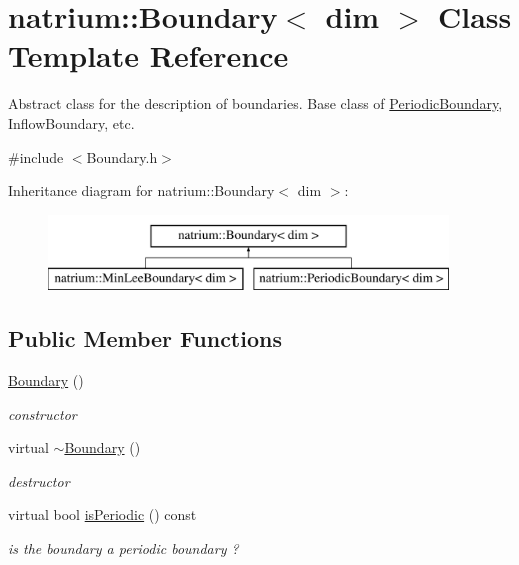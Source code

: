 \hypertarget{classnatrium_1_1Boundary}{\section{natrium\-:\-:Boundary$<$ dim $>$ Class Template Reference}
\label{classnatrium_1_1Boundary}
}


Abstract class for the description of boundaries. Base class of \hyperlink{classnatrium_1_1PeriodicBoundary}{Periodic\-Boundary}, Inflow\-Boundary, etc.  




{\ttfamily \#include $<$Boundary.\-h$>$}

Inheritance diagram for natrium\-:\-:Boundary$<$ dim $>$\-:\begin{figure}[H]
\begin{center}
\leavevmode
\includegraphics[height=2.000000cm]{classnatrium_1_1Boundary}
\end{center}
\end{figure}
\subsection*{Public Member Functions}
\begin{DoxyCompactItemize}
\item 
\hypertarget{classnatrium_1_1Boundary_a987978143b16ef0bbadd2b465dc1882d}{\hyperlink{classnatrium_1_1Boundary_a987978143b16ef0bbadd2b465dc1882d}{Boundary} ()}\label{classnatrium_1_1Boundary_a987978143b16ef0bbadd2b465dc1882d}

\begin{DoxyCompactList}\small\item\em constructor \end{DoxyCompactList}\item 
\hypertarget{classnatrium_1_1Boundary_a63e8fb8ec44288b9145f819b515ae6d9}{virtual \hyperlink{classnatrium_1_1Boundary_a63e8fb8ec44288b9145f819b515ae6d9}{$\sim$\-Boundary} ()}\label{classnatrium_1_1Boundary_a63e8fb8ec44288b9145f819b515ae6d9}

\begin{DoxyCompactList}\small\item\em destructor \end{DoxyCompactList}\item 
\hypertarget{classnatrium_1_1Boundary_acb651f4148b4e00f08258e1321c43235}{virtual bool \hyperlink{classnatrium_1_1Boundary_acb651f4148b4e00f08258e1321c43235}{is\-Periodic} () const }\label{classnatrium_1_1Boundary_acb651f4148b4e00f08258e1321c43235}

\begin{DoxyCompactList}\small\item\em is the boundary a periodic boundary ? \end{DoxyCompactList}\end{DoxyCompactItemize}


